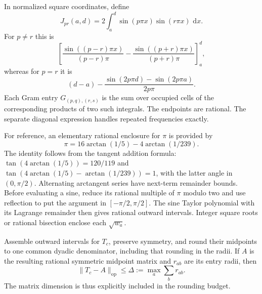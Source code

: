 \documentclass[11pt,reqno]{amsart}
\numberwithin{equation}{section}
\newcommand{\dd}{\,\mathrm d}
\newcommand{\norm}[1]{\lVert#1\rVert}
\begin{document}
In normalized square coordinates, define
\[
 J_{pr}(a,d)=2\int_a^d\sin(p\pi x)\sin(r\pi x)\,\dd x .
\]
For $p\ne r$ this is
\begin{equation}\label{arith:sine-integrals}
 \left[
   \frac{\sin((p-r)\pi x)}{(p-r)\pi}
  -\frac{\sin((p+r)\pi x)}{(p+r)\pi}
 \right]_a^d,
\end{equation}
whereas for $p=r$ it is
\[
 (d-a)-\frac{\sin(2p\pi d)-\sin(2p\pi a)}{2p\pi}.
\]
Each Gram entry $G_{(p,q),(r,s)}$ is the sum over occupied cells
of the corresponding products of two such integrals.
The endpoints are rational.  The separate diagonal expression
handles repeated frequencies exactly.

For reference, an elementary rational enclosure for $\pi$ is
provided by
\begin{equation}\label{arith:machin}
 \pi=16\arctan(1/5)-4\arctan(1/239).
\end{equation}
The identity follows from the tangent addition formula:
$\tan(4\arctan(1/5))=120/119$ and
$\tan(4\arctan(1/5)-\arctan(1/239))=1$, with the latter
angle in $(0,\pi/2)$.  Alternating arctangent series have
next-term remainder bounds.  Before evaluating a sine, reduce
its rational multiple of $\pi$ modulo two and use reflection
to put the argument in $[-\pi/2,\pi/2]$.  The sine Taylor
polynomial with its Lagrange remainder then gives rational
outward intervals.  Integer square roots or rational bisection
enclose each $\sqrt{w_a}$.

Assemble outward intervals for $T_c$, preserve symmetry, and
round their midpoints to one common dyadic denominator,
including that rounding in the radii.  If $A$ is the resulting
rational symmetric midpoint matrix and $r_{ab}$ are its entry
radii, then
\begin{equation}\label{arith:matrix-radius}
 \norm{T_c-A}_{\mathrm{op}}
 \le\Delta:=\max_a\sum_b r_{ab}.
\end{equation}
The matrix dimension is thus explicitly included in the
rounding budget.
\end{document}
